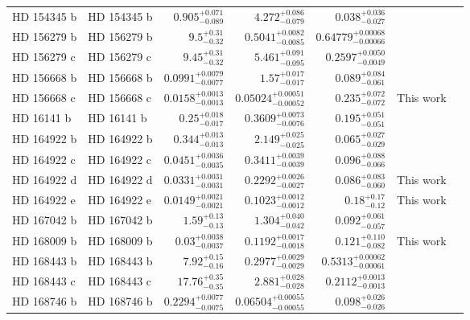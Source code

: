\begin{longtable*}{llrrrrr}
HD 154345 b & HD 154345 b & $0.905^{+0.071}_{-0.089}$ & $4.272^{+0.086}_{-0.079}$ & $0.038^{+0.036}_{-0.027}$ & \cite{Wright08} & \\ 
HD 156279 b & HD 156279 b & $9.5^{+0.31}_{-0.32}$ & $0.5041^{+0.0082}_{-0.0085}$ & $0.64779^{+0.00068}_{-0.00066}$ & \cite{Diaz12} & \\ 
HD 156279 c & HD 156279 c & $9.45^{+0.31}_{-0.32}$ & $5.461^{+0.091}_{-0.095}$ & $0.2597^{+0.0050}_{-0.0049}$ & \cite{Bryan16} & \\ 
HD 156668 b & HD 156668 b & $0.0991^{+0.0079}_{-0.0077}$ & $1.57^{+0.017}_{-0.017}$ & $0.089^{+0.084}_{-0.061}$ & \cite{Howard11} & \\ 
HD 156668 c & HD 156668 c & $0.0158^{+0.0013}_{-0.0013}$ & $0.05024^{+0.00051}_{-0.00052}$ & $0.235^{+0.072}_{-0.072}$ & This work & \\ 
HD 16141 b & HD 16141 b & $0.25^{+0.018}_{-0.017}$ & $0.3609^{+0.0073}_{-0.0076}$ & $0.195^{+0.051}_{-0.051}$ & \cite{Butler06} & \\ 
HD 164922 b & HD 164922 b & $0.344^{+0.013}_{-0.013}$ & $2.149^{+0.025}_{-0.025}$ & $0.065^{+0.027}_{-0.029}$ & \cite{Butler06} & \\ 
HD 164922 c & HD 164922 c & $0.0451^{+0.0036}_{-0.0035}$ & $0.3411^{+0.0039}_{-0.0039}$ & $0.096^{+0.088}_{-0.066}$ & \cite{Fulton16} & \\ 
HD 164922 d & HD 164922 d & $0.0331^{+0.0031}_{-0.0031}$ & $0.2292^{+0.0026}_{-0.0027}$ & $0.086^{+0.083}_{-0.060}$ & This work & \\ 
HD 164922 e & HD 164922 e & $0.0149^{+0.0021}_{-0.0021}$ & $0.1023^{+0.0012}_{-0.0012}$ & $0.18^{+0.17}_{-0.12}$ & This work & \\ 
HD 167042 b & HD 167042 b & $1.59^{+0.13}_{-0.13}$ & $1.304^{+0.040}_{-0.042}$ & $0.092^{+0.061}_{-0.057}$ & \cite{Johnson08} & \\ 
HD 168009 b & HD 168009 b & $0.03^{+0.0038}_{-0.0037}$ & $0.1192^{+0.0017}_{-0.0018}$ & $0.121^{+0.110}_{-0.082}$ & This work & \\ 
HD 168443 b & HD 168443 b & $7.92^{+0.15}_{-0.16}$ & $0.2977^{+0.0029}_{-0.0029}$ & $0.5313^{+0.00062}_{-0.00061}$ & \cite{Wittenmyer07} & \\ 
HD 168443 c & HD 168443 c & $17.76^{+0.35}_{-0.35}$ & $2.881^{+0.028}_{-0.028}$ & $0.2112^{+0.0013}_{-0.0013}$ & \cite{Wittenmyer07} & \\ 
HD 168746 b & HD 168746 b & $0.2294^{+0.0077}_{-0.0075}$ & $0.06504^{+0.00055}_{-0.00055}$ & $0.098^{+0.026}_{-0.026}$ & \cite{Pepe02} & \\ 

\end{longtable*}
